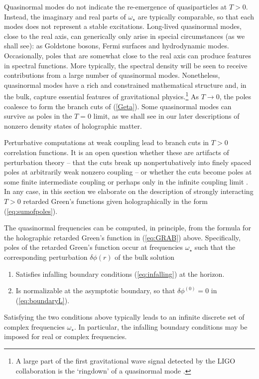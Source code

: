 \documentclass[10pt, oneside]{book}
\begin{document}
\begin{doublespace}
Quasinormal modes do not indicate the re-emergence of quasiparticles at $T>0$. Instead, the imaginary and real parts of $\omega_\star$ are typically comparable, so that each modes does not represent a stable excitations. Long-lived quasinormal modes, close to the real axis, can generically only arise in special circumstances (as we shall see): as Goldstone bosons, Fermi surfaces and hydrodynamic modes. Occasionally, poles that are somewhat close to the real axis can produce features in spectral functions. More typically, the spectral density will be seen to receive contributions from a large number of quasinormal modes. Nonetheless, quasinormal modes have a rich and constrained mathematical structure and, in the bulk, capture essential features of gravitational physics.\footnote{A large part of the first gravitational wave signal detected by the LIGO collaboration is the `ringdown' of a quasinormal mode \cite{PhysRevLett.116.061102}.} As $T \to 0$, the poles coalesce to form the branch cuts of (\ref{Geta}). Some quasinormal modes can survive as poles in the $T = 0$ limit, as we shall see in our later descriptions of nonzero density states of holographic matter.

Perturbative computations at weak coupling lead to branch cuts in $T>0$ correlation functions. It is an open question whether these are artifacts of perturbation theory -- that the cuts break up nonpertubatively into finely spaced poles at arbitrarily weak nonzero coupling -- or whether the cuts become poles at some finite intermediate coupling or perhaps only in the infinite coupling limit \cite{Hartnoll:2005ju,Romatschke:2015gic}. In any case, in this section we elaborate on the description of strongly interacting $T>0$ retarded Green's functions given holographically in the form (\ref{eq:sumofpoles}).

The quasinormal frequencies can be computed, in principle, from the formula for the holographic retarded Green's function in (\ref{eq:GRAB}) above. Specifically, poles of the retarded Green's function occur at frequencies $\omega_\star$ such that the corresponding perturbation $\delta \phi(r)$ of the bulk solution \cite{Birmingham:2001pj,Son:2002sd}
\begin{enumerate}
\item Satisfies infalling boundary conditions (\ref{eq:infalling}) at the horizon.
\item Is normalizable at the asymptotic boundary, so that $\delta \phi^{(0)} = 0$ in (\ref{eq:boundaryL}).
\end{enumerate}
Satisfying the two conditions above typically leads to an infinite discrete set of complex frequencies $\omega_\star$.
In particular, the infalling boundary conditions may be imposed for real or complex frequencies.


\end{doublespace}
\end{document}
